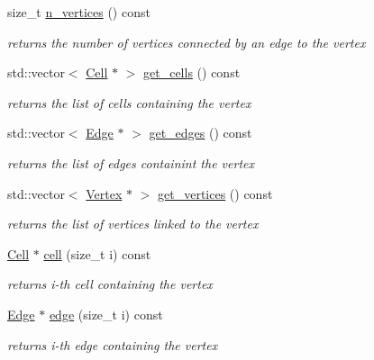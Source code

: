 \begin{DoxyCompactItemize}
size\+\_\+t \hyperlink{group__Mesh_ga64033a69394a8fa757ca097407ab5e0a}{n\+\_\+vertices} () const
\begin{DoxyCompactList}\small\item\em returns the number of vertices connected by an edge to the vertex \end{DoxyCompactList}\item 
std\+::vector$<$ \hyperlink{classHArDCore2D_1_1Cell}{Cell} $\ast$ $>$ \hyperlink{group__Mesh_gaff000e01e8c4bd44162ae8b526950d31}{get\+\_\+cells} () const
\begin{DoxyCompactList}\small\item\em returns the list of cells containing the vertex \end{DoxyCompactList}\item 
std\+::vector$<$ \hyperlink{classHArDCore2D_1_1Edge}{Edge} $\ast$ $>$ \hyperlink{group__Mesh_ga4a43457a0b69df1db3f3892824c272bb}{get\+\_\+edges} () const
\begin{DoxyCompactList}\small\item\em returns the list of edges containint the vertex \end{DoxyCompactList}\item 
std\+::vector$<$ \hyperlink{classHArDCore2D_1_1Vertex}{Vertex} $\ast$ $>$ \hyperlink{group__Mesh_ga67a622b04ce68250a53bc0825487bb6e}{get\+\_\+vertices} () const
\begin{DoxyCompactList}\small\item\em returns the list of vertices linked to the vertex \end{DoxyCompactList}\item 
\mbox{\label{classHArDCore2D_1_1Vertex_a5054b903ff91506cc7d75afa44fd864b}} 
\hyperlink{classHArDCore2D_1_1Cell}{Cell} $\ast$ \hyperlink{classHArDCore2D_1_1Vertex_a5054b903ff91506cc7d75afa44fd864b}{cell} (size\+\_\+t i) const
\begin{DoxyCompactList}\small\item\em returns i-\/th cell containing the vertex \end{DoxyCompactList}\item 
\mbox{\label{classHArDCore2D_1_1Vertex_a782d7982e24169c50ea4631ffd3d9b55}} 
\hyperlink{classHArDCore2D_1_1Edge}{Edge} $\ast$ \hyperlink{classHArDCore2D_1_1Vertex_a782d7982e24169c50ea4631ffd3d9b55}{edge} (size\+\_\+t i) const
\begin{DoxyCompactList}\small\item\em returns i-\/th edge containing the vertex \end{DoxyCompactList}\item 

\end{DoxyCompactItemize}
